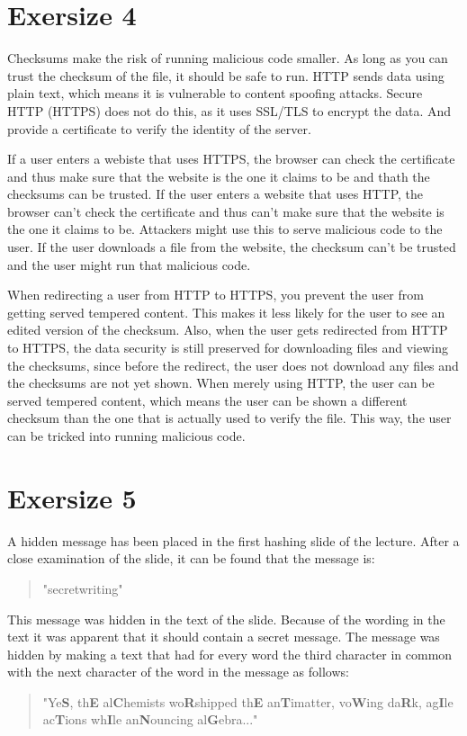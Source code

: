 \documentclass[twoside, a4paper, fleqn, reqno]{article}
\begin{document}
\section*{Exersize 4}
Checksums make the risk of running malicious code smaller. 
As long as you can trust the checksum of the file, it should be safe to run.
HTTP sends data using plain text, which means it is vulnerable to content spoofing attacks.
Secure HTTP (HTTPS) does not do this, as it uses SSL/TLS to encrypt the data.
And provide a certificate to verify the identity of the server.
\par If a user enters a webiste that uses HTTPS, the browser can check the certificate
and thus make sure that the website is the one it claims to be and thath the checksums can be trusted.
If the user enters a website that uses HTTP, the browser can't check the certificate and thus can't
make sure that the website is the one it claims to be. Attackers might use this to serve
malicious code to the user. If the user downloads a file from the website, the checksum can't be
trusted and the user might run that malicious code.
\par When redirecting a user from HTTP to HTTPS, you prevent the user from getting served
tempered content. This makes it less likely for the user to see an edited version of the
checksum. Also, when the user gets redirected from HTTP to HTTPS, the data security is still
preserved for downloading files and viewing the checksums, since before the redirect,
the user does not download any files and the checksums are not yet shown.
When merely using HTTP, the user can be served tempered content, which means the user
can be shown a different checksum than the one that is actually used to verify the file.
This way, the user can be tricked into running malicious code.

\section*{Exersize 5}
A hidden message has been placed in the first hashing slide of the lecture.
After a close examination of the slide, it can be found that the message is:
\begin{quote}
	"secretwriting"
\end{quote}
This message was hidden in the text of the slide. Because of the wording in the text
it was apparent that it should contain a secret message. The message was hidden by
making a text that had for every word the third character in common with the next
character of the word in the message as follows:
\begin{quote}
	"Ye\textbf{S}, th\textbf{E} al\textbf{C}hemists wo\textbf{R}shipped th\textbf{E}
	an\textbf{T}imatter, vo\textbf{W}ing da\textbf{R}k, 
	ag\textbf{I}le ac\textbf{T}ions wh\textbf{I}le an\textbf{N}ouncing al\textbf{G}ebra..."
\end{quote}
		
\end{document}
